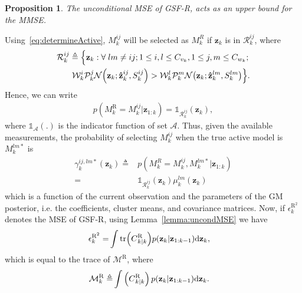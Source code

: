 \documentclass[10pt,twocolumn,twoside]{IEEEtran}
\newtheorem{Prop}{Proposition}
\newcommand{\corcol}[1]{\textcolor{CorCol}{#1}}
\begin{document}
\begin{Prop}
\label{prop:UB}
The unconditional MSE of GSF-R, acts as an upper bound for the MMSE.
\end{Prop}
\begin{IEEEproof}
Using~\eqref{eq:determineActive}, \(M_k^{ij}\) will be selected as \(M_k^{R}\) if \(\mathbf{z}_k\) is in \(\mathcal{R}^{ij}_k \), where
\begin{eqnarray}
\nonumber
\mathcal{R}^{ij}_k \triangleq \Big \lbrace \mathbf{z}_k: \forall \; lm\neq ij; 1 \leq i,l \leq {C_{v_k}}, 1\leq j,m \leq C_{w_k}; \Big. \\ \label{eq:defRij}
\Big. \corcol{\mathcal{W}^i_k\mathcal{P}^j_k}\mathcal{N}{\left(\mathbf{z}_k ; \mathbf{\hat{z}}_{k}^{ij}, S_k^{ij}\right)} > \corcol{\mathcal{W}^l_k\mathcal{P}^m_k}\mathcal{N}{\left(\mathbf{z}_k ; \mathbf{\hat{z}}_{k}^{lm}, S_k^{lm}\right)}\Big\rbrace.
\end{eqnarray}
Hence, we can write
\begin{align}
\label{eq:probijMax}
p{\left(M^{\mathrm{R}}_k = M_k^{ij}|\mathbf{z}_{1:k}\right)} = \mathds{1}_{\mathcal{R}^{ij}_k}{\left(\mathbf{z}_k\right)},
\end{align}
where \(\mathds{1}_\mathcal{A}{\left(.\right)}\) is the indicator function of set \(\mathcal{A}\). Thus, given the available measurements, the probability of selecting \(M^{ij}_k\) when the true active model is \(M^{lm*}_k\) is
\corcol{\begin{align}
\label{eq:probmaxijbutlm}
\gamma_k^{ij,lm*}{\left(\mathbf{z}_k\right)}  \triangleq & p{\left(M^{R}_k = M_k^{ij}, M_k^{lm*}\big|\mathbf{z}_{1:k}\right)}
\\
\label{eq:gammaijlm}
 = & \mathds{1}_{\mathcal{R}^{ij}_k}{\left(\mathbf{z}_k\right)}\mu_k^{lm}{\left(\mathbf{z}_{k}\right)} 
\end{align}
which is a function of the current observation and the parameters of the GM posterior, i.e. the coefficients, cluster means, and covariance matrices.}
Now, if \(\epsilon_k^{\mathrm{R}^2}\) denotes the MSE of GSF-R, using Lemma~\ref{lemma:uncondMSE} we have
\begin{align}
\label{eq:defUBMSE}
\epsilon_k ^{\mathrm{R}^2} = & \int \mathrm{tr}{\left(\corcol{C}_{k|k}^{\mathrm{R}}\right)}p{\left(\mathbf{{z}}_{k}|\mathbf{{z}}_{1:k-1}\right)} \mathrm{d}\mathbf{{z}}_{k},
\end{align}
which is equal to the trace of \(\mathcal{M}^{\mathrm{R}}\), where
\begin{align}
\label{eq:MUB}
\mathcal{M}^{\mathrm{R}}_k \triangleq &  \int \left(\corcol{C}_{k|k}^{\mathrm{R}}\right)p{\left(\mathbf{{z}}_{k}|\mathbf{{z}}_{1:k-1}\right)} \mathrm{d}\mathbf{{z}}_{k}.

\end{align}
\end{IEEEproof}
\end{document}
